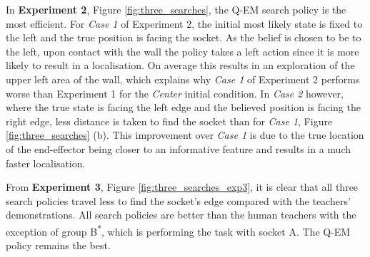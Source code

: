 In \textbf{Experiment 2}, Figure \ref{fig:three_searches}, the Q-EM search policy is the most efficient. For \textit{Case 1} 
of Experiment 2, the initial most likely state is fixed to the left and the true position is facing the socket. 
As the belief is chosen to be to the left, upon contact with the wall the policy takes a left action since it 
is more likely to result in a localisation. 
On average this results in an exploration of the upper left area of the wall, which explains why \textit{Case 1} of Experiment 2 
performs worse than Experiment 1 for the \textit{Center} initial condition. In \textit{Case 2} however, where the 
true state is facing the left edge and the believed position is facing the right edge, less distance is taken to find the 
socket than for \textit{Case 1}, Figure \ref{fig:three_searches} (b). This improvement over \textit{Case 1} is due to the true location of 
the end-effector being closer to an informative feature and results in a much faster localisation.

From \textbf{Experiment 3}, Figure \ref{fig:three_searches_exp3}, it is clear that all three search policies travel 
less to find the socket's edge compared with the teachers' demonstrations. 
All search policies are better than the human teachers with the exception of group B\textsuperscript{*}, 
which is performing the task with socket A. The Q-EM policy remains the best. 

